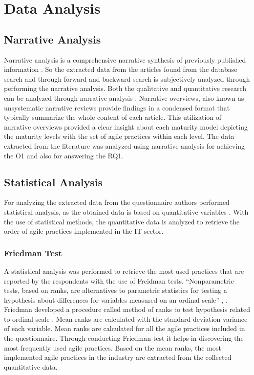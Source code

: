\documentclass[a4paper,oneside]{bth}
\begin{document}
\section{Data Analysis}
\subsection{Narrative Analysis}
Narrative analysis is a comprehensive narrative synthesis of previously published information \cite{green_writing_2006}. So the extracted data from the articles found from the database search and through forward and backward search is subjectively analyzed through performing the narrative analysis. Both the qualitative and quantitative research can be analyzed through narrative analysis \cite{petticrew_testing_2009}. Narrative overviews, also known as unsystematic narrative reviews provide findings in a condensed format that typically summarize the whole content of each article. This utilization of narrative overviews provided a clear insight about each maturity model depicting the maturity levels with the set of agile practices within each level. The data extracted from the literature was analyzed using narrative analysis for achieving the O1 and also for answering the RQ1.
\subsection{Statistical Analysis}
For analyzing the extracted data from the questionnaire authors performed statistical analysis, as the obtained data is based on quantitative variables \cite{sapsford_data_2006}. With the use of statistical methods, the quantitative data is analyzed to retrieve the order of agile practices implemented in the IT sector.
\subsubsection{Friedman Test}
A statistical analysis was performed to retrieve the most used practices that are reported by the respondents with the use of Freidman tests. “Nonparametric tests, based on ranks, are alternatives to parametric statistics for testing a hypothesis about differences for variables measured on an ordinal scale” \cite{sheldon_use_1996}, \cite{robson_real_2016}. Friedman developed a procedure called method of ranks to test hypothesis related to ordinal scale \cite{sheldon_use_1996}. Mean ranks are calculated with the standard deviation variance of each variable. Mean ranks are calculated for all the agile practices included in the questionnaire. Through conducting Friedman test it helps in discovering the most frequently used agile practices.  Based on the mean ranks, the most implemented agile practices in the industry are extracted from the collected quantitative data.
\end{document}
